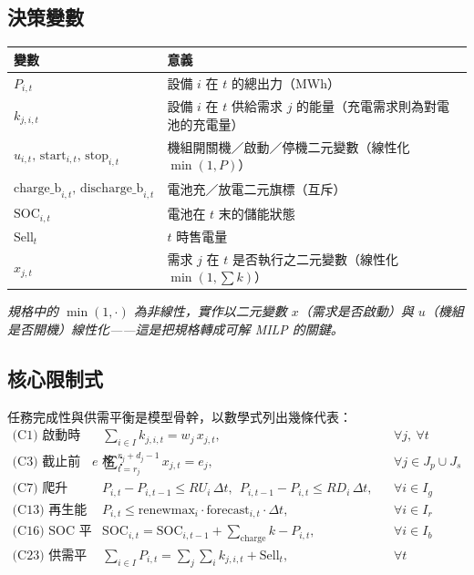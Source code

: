 \documentclass[12pt,a4paper,fontset=none]{ctexart}
\begin{document}
\subsection{決策變數}
\begin{center}
\begin{tabularx}{\linewidth}{lX}
\toprule
\textbf{變數} & \textbf{意義} \\
\midrule
$P_{i,t}$ & 設備 $i$ 在 $t$ 的總出力（MWh） \\
$k_{j,i,t}$ & 設備 $i$ 在 $t$ 供給需求 $j$ 的能量（充電需求則為對電池的充電量） \\
$u_{i,t},\,\mathrm{start}_{i,t},\,\mathrm{stop}_{i,t}$ & 機組開關機／啟動／停機二元變數（線性化 $\min(1,P)$） \\
$\mathrm{charge\_b}_{i,t},\,\mathrm{discharge\_b}_{i,t}$ & 電池充／放電二元旗標（互斥） \\
$\mathrm{SOC}_{i,t}$ & 電池在 $t$ 末的儲能狀態 \\
$\mathrm{Sell}_t$ & $t$ 時售電量 \\
$x_{j,t}$ & 需求 $j$ 在 $t$ 是否執行之二元變數（線性化 $\min(1,\textstyle\sum k)$） \\
\bottomrule
\end{tabularx}
\end{center}
\noindent\textit{規格中的 $\min(1,\cdot)$ 為非線性，實作以二元變數 $x$（需求是否啟動）與 $u$（機組是否開機）線性化——這是把規格轉成可解 MILP 的關鍵。}

\subsection{核心限制式}
任務完成性與供需平衡是模型骨幹，以數學式列出幾條代表：
\begin{align}
\text{(C1) 啟動時收滿需求：}\quad & \textstyle\sum_{i\in I} k_{j,i,t} = w_j\, x_{j,t}, && \forall j,\ \forall t \\
\text{(C3) 截止前累積執行 $e$ 格：}\quad & \textstyle\sum_{t=r_j}^{r_j+d_j-1} x_{j,t} = e_j, && \forall j\in J_p\cup J_s \\
\text{(C7) 爬升率：}\quad & P_{i,t}-P_{i,t-1}\le RU_i\,\Delta t,\ \ P_{i,t-1}-P_{i,t}\le RD_i\,\Delta t, && \forall i\in I_g \\
\text{(C13) 再生能源上限：}\quad & P_{i,t}\le \mathrm{renewmax}_i\cdot\mathrm{forecast}_{i,t}\cdot\Delta t, && \forall i\in I_r \\
\text{(C16) SOC 平衡：}\quad & \mathrm{SOC}_{i,t}=\mathrm{SOC}_{i,t-1}+\!\!\sum_{\text{charge}}\!\! k - P_{i,t}, && \forall i\in I_b \\
\text{(C23) 供需平衡：}\quad & \textstyle\sum_{i\in I}P_{i,t}=\sum_{j}\sum_{i}k_{j,i,t}+\mathrm{Sell}_t, && \forall t
\end{align}
\end{document}
